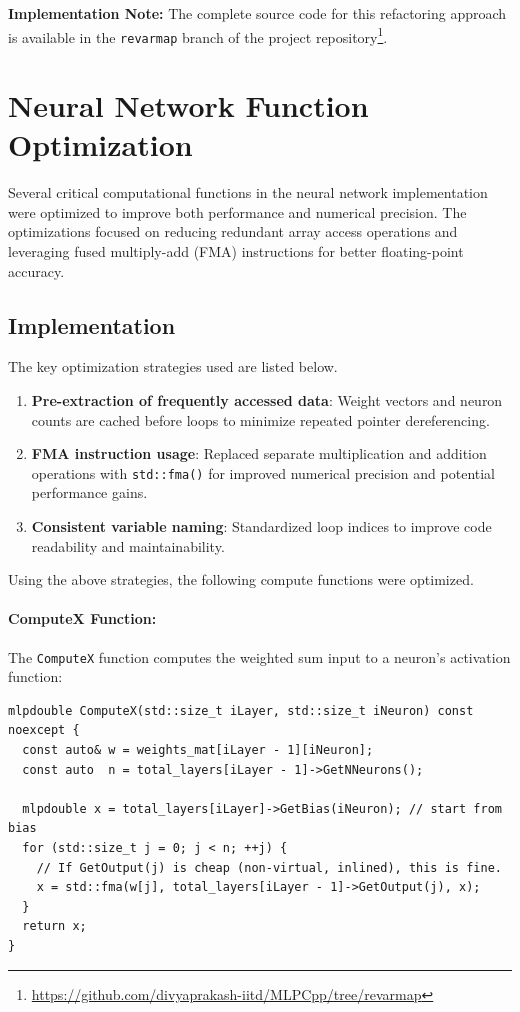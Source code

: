 \documentclass{article}
\begin{document}
\noindent\textbf{Implementation Note:} The complete source code for this refactoring approach is available in the \texttt{revarmap} branch of the project repository\footnote{\url{https://github.com/divyaprakash-iitd/MLPCpp/tree/revarmap}}.

\section{Neural Network Function Optimization}
\label{sec:nnfunc}
Several critical computational functions in the neural network implementation were optimized to improve both performance and numerical precision. The optimizations focused on reducing redundant array access operations and leveraging fused multiply-add (FMA) instructions for better floating-point accuracy.

\subsection{Implementation}
The key optimization strategies used are listed below.
\begin{enumerate}
  \item \textbf{Pre-extraction of frequently accessed data}: Weight vectors and neuron counts are cached before loops to minimize repeated pointer dereferencing.
  \item \textbf{FMA instruction usage}: Replaced separate multiplication and addition operations with \texttt{std::fma()} for improved numerical precision and potential performance gains.
  \item \textbf{Consistent variable naming}: Standardized loop indices to improve code readability and maintainability.
\end{enumerate}

Using the above strategies, the following compute functions were optimized. 

\paragraph{ComputeX Function:}
The \texttt{ComputeX} function computes the weighted sum input to a neuron's activation function:

\begin{verbatim}
mlpdouble ComputeX(std::size_t iLayer, std::size_t iNeuron) const noexcept {
  const auto& w = weights_mat[iLayer - 1][iNeuron];
  const auto  n = total_layers[iLayer - 1]->GetNNeurons();

  mlpdouble x = total_layers[iLayer]->GetBias(iNeuron); // start from bias
  for (std::size_t j = 0; j < n; ++j) {
    // If GetOutput(j) is cheap (non-virtual, inlined), this is fine.
    x = std::fma(w[j], total_layers[iLayer - 1]->GetOutput(j), x);
  }
  return x;
}
\end{verbatim}
\end{document}
